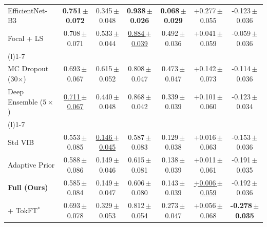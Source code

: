 \begin{table}[t]
\begin{tabular}{l cc cc cc}
EfficientNet-B3 & \textbf{0.751{\tiny\,$\pm$0.072}} & \cellcolor{red!11}0.345{\tiny\,$\pm$0.048} & \textbf{0.938{\tiny\,$\pm$0.026}} & \textbf{0.068{\tiny\,$\pm$0.029}} & \cellcolor{red!22}+0.277{\tiny\,$\pm$0.055} & \cellcolor{red!15}-0.123{\tiny\,$\pm$0.036} \\
Focal + LS & 0.708{\tiny\,$\pm$0.071} & \cellcolor{red!19}0.533{\tiny\,$\pm$0.044} & \underline{0.884{\tiny\,$\pm$0.039}} & \cellcolor{red!22}0.492{\tiny\,$\pm$0.036} & \cellcolor{red!3}+0.041{\tiny\,$\pm$0.059} & \cellcolor{red!13}-0.059{\tiny\,$\pm$0.036} \\
\addlinespace[2pt]\cmidrule(l){1-7}\addlinespace[2pt]
\multicolumn{7}{l}{\textit{Sampling-based / ensemble}} \\
MC Dropout (30$\times$) & 0.693{\tiny\,$\pm$0.067} & \cellcolor{red!22}0.615{\tiny\,$\pm$0.052} & 0.808{\tiny\,$\pm$0.047} & \cellcolor{red!21}0.473{\tiny\,$\pm$0.047} & \cellcolor{red!11}+0.142{\tiny\,$\pm$0.073} & \cellcolor{red!15}-0.114{\tiny\,$\pm$0.036} \\
Deep Ensemble ($5\times$) & \underline{0.711{\tiny\,$\pm$0.067}} & \cellcolor{red!15}0.440{\tiny\,$\pm$0.048} & 0.868{\tiny\,$\pm$0.042} & \cellcolor{red!14}0.339{\tiny\,$\pm$0.039} & \cellcolor{red!8}+0.101{\tiny\,$\pm$0.060} & \cellcolor{red!15}-0.123{\tiny\,$\pm$0.034} \\
\addlinespace[2pt]\cmidrule(l){1-7}\addlinespace[2pt]
\multicolumn{7}{l}{\textit{VIB family}} \\
Std VIB & 0.553{\tiny\,$\pm$0.085} & \cellcolor{red!3}\underline{0.146{\tiny\,$\pm$0.045}} & 0.587{\tiny\,$\pm$0.083} & \cellcolor{red!3}0.129{\tiny\,$\pm$0.038} & +0.016{\tiny\,$\pm$0.063} & \cellcolor{red!17}-0.153{\tiny\,$\pm$0.036} \\
Adaptive Prior & 0.588{\tiny\,$\pm$0.086} & \cellcolor{red!3}0.149{\tiny\,$\pm$0.046} & 0.615{\tiny\,$\pm$0.081} & \cellcolor{red!4}0.138{\tiny\,$\pm$0.039} & +0.011{\tiny\,$\pm$0.061} & \cellcolor{red!18}-0.191{\tiny\,$\pm$0.035} \\
\rowcolor{blue!8}\textbf{\qvib{} Full (Ours)} & 0.585{\tiny\,$\pm$0.084} & \cellcolor{red!3}0.149{\tiny\,$\pm$0.047} & 0.606{\tiny\,$\pm$0.080} & \cellcolor{red!4}0.143{\tiny\,$\pm$0.039} & \underline{+0.006{\tiny\,$\pm$0.059}} & \cellcolor{green!18}-0.192{\tiny\,$\pm$0.036} \\
\qvib{} + TokFT$^\ast$ & 0.693{\tiny\,$\pm$0.078} & \cellcolor{red!10}0.329{\tiny\,$\pm$0.053} & 0.812{\tiny\,$\pm$0.054} & \cellcolor{red!11}0.273{\tiny\,$\pm$0.047} & \cellcolor{red!4}+0.056{\tiny\,$\pm$0.068} & \cellcolor{red!22}\textbf{-0.278{\tiny\,$\pm$0.035}} \\

\end{tabular}
\end{table}
